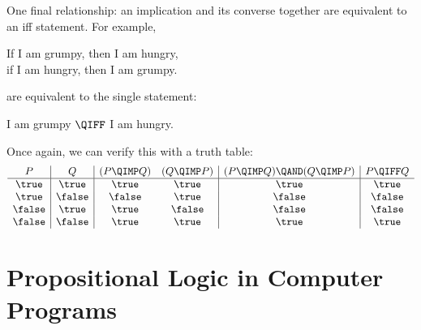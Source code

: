 One final relationship: an implication and its converse together are
equivalent to an iff statement.  For example,
%
\begin{center}
If I am grumpy, then I am hungry, \QAND \\
if I am hungry, then I am grumpy.
\end{center}
%
are equivalent to the single statement:
%
\begin{center}
I am grumpy $\QIFF$ I am hungry.
\end{center}
%
Once again, we can verify this with a truth table:
%
\[
\begin{array}{c|c|cc|c|c}
P & Q
& (P \QIMP Q) & (Q \QIMP P) 
& (P\QIMP Q) \QAND (Q \QIMP P) & P \QIFF Q \\
\hline
\true  &  \true  &\true  &\true  &\true & \true \\
\true  &  \false &\false &\true  &\false& \false\\
\false &  \true  &\true  &\false &\false& \false\\
\false &  \false &\true  &\true  &\true & \true 
\end{array}
\]

\begin{problems}

\classproblems
{}

\homeworkproblems
{}
\end{problems}

\section{Propositional Logic in Computer Programs}

